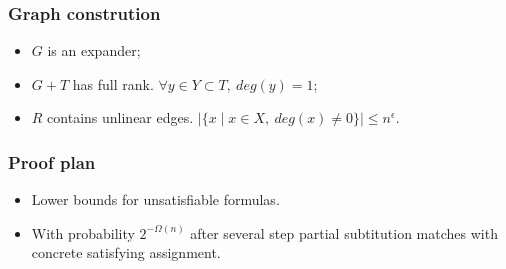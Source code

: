 \begin{frame}
    \frametitle{Graph constrution}

    \pause
    

    \begin{itemize}
	    \item $G$ is an expander;
   		\pause
        \pause
        \item $G + T$ has full rank. $\forall y \in Y \subset T, ~
		    deg(y) = 1$;
        \pause
        \pause
        \item $R$ contains unlinear edges. $|\{x \mid x \in X, ~ deg(x)
		    \ne 0\}| \le n^{\epsilon}$.
    \end{itemize}
\end{frame}

\begin{frame}
	\frametitle{Proof plan}

	\begin{itemize}
		\pause
		\item Lower bounds for unsatisfiable formulas.
		\pause
		\item With probability $2^{-\Omega(n)}$ after several step
    		partial subtitution matches with concrete satisfying
            assignment.
	\end{itemize}
   
\end{frame}